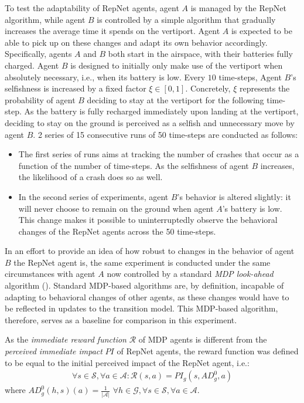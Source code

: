 To test the adaptability of RepNet agents, agent $A$ is managed by the RepNet algorithm, while agent $B$ is controlled by a simple algorithm that gradually increases the average time it spends on the vertiport. Agent $A$ is expected to be able to pick up on these changes and adapt its own behavior accordingly.
Specifically, agents $A$ and $B$ both start in the airspace, with their batteries fully charged. Agent $B$ is designed to initially only make use of the vertiport when absolutely necessary, i.e., when its battery is low. Every $10$ time-steps, Agent $B$'s selfishness is increased by a fixed factor $\xi \in [0,1]$. Concretely, $\xi$ represents the probability of agent $B$ deciding to stay at the vertiport for the following time-step. As the battery is fully recharged immediately upon landing at the vertiport, deciding to stay on the ground is perceived as a selfish and unnecessary move by agent $B$. 
2 series of 15 consecutive runs of 50 time-steps are conducted as follows:
\begin{itemize}
    \item The first series of runs aims at tracking the number of crashes that occur as a function of the number of time-steps. As the selfishness of agent $B$ increases, the likelihood of a crash does so as well.
    \item In the second series of experiments, agent $B$'s behavior is altered slightly: it will never choose to remain on the ground when agent $A$'s battery is low. This change makes it possible to uninterruptedly observe the behavioral changes of the RepNet agents across the 50 time-steps.
\end{itemize}
In an effort to provide an idea of how robust to changes in the behavior of agent $B$ the RepNet agent is, the same experiment is conducted under the same circumstances with agent $A$ now controlled by a standard \textit{MDP look-ahead} algorithm (). Standard MDP-based algorithms are, by definition, incapable of adapting to behavioral changes of other agents, as these changes would have to be reflected in updates to the transition model. This MDP-based algorithm, therefore, serves as a baseline for comparison in this experiment.

As the \textit{immediate reward function} $\mathcal{R}$ of MDP agents is different from the \textit{perceived immediate impact} $PI$ of RepNet agents, the reward function was defined to be equal to the initial perceived impact of the RepNet agent, i.e.:
\begin{align}
    \forall s \in \mathcal{S}, \forall a \in \mathcal{A}: \mathcal{R}(s,a) = PI_g(s, AD_g^0, a)
\end{align}
where $AD_g^0(h,s)(a) = \frac{1}{|\mathcal{A}|} \,\, \forall h \in \mathcal{G}, \forall s \in \mathcal{S}, \forall a \in \mathcal{A}$. 



